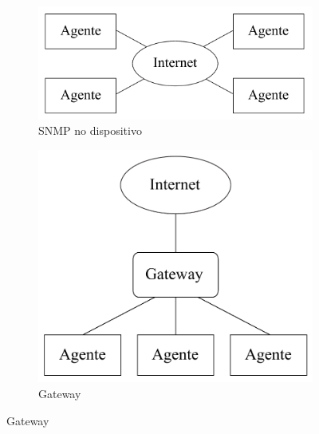\documentclass[twoside,english,brazilian]{UNISINOSmonografia}
\begin{document}
\begin{figure}
    \caption{Arquiteturas de Integração SNMP--IoT}
	\label{fig:arch}
	\centering
    \begin{subfigure}[b]{0.4\textwidth}
        \includegraphics[width=\textwidth,keepaspectratio=true]{arch_snmp}
		\caption{SNMP no dispositivo}
		\vspace{.2\textwidth}
    \end{subfigure}
\hspace{.1\textwidth}
    \begin{subfigure}[b]{0.4\textwidth}
        \includegraphics[width=\textwidth,keepaspectratio=true]{arch_gateway}
		\caption{Gateway}
    \end{subfigure}
\end{figure}
\end{document}
